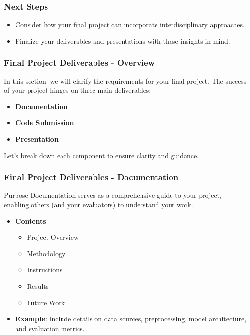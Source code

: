 \documentclass[aspectratio=169]{beamer}
\begin{document}
\begin{frame}[fragile]
    \frametitle{Next Steps}
    \begin{itemize}
        \item Consider how your final project can incorporate interdisciplinary approaches.
        \item Finalize your deliverables and presentations with these insights in mind.
    \end{itemize}
\end{frame}

\begin{frame}[fragile]
    \frametitle{Final Project Deliverables - Overview}
    In this section, we will clarify the requirements for your final project. The success of your project hinges on three main deliverables:
    \begin{itemize}
        \item \textbf{Documentation}
        \item \textbf{Code Submission}
        \item \textbf{Presentation}
    \end{itemize}
    Let’s break down each component to ensure clarity and guidance.
\end{frame}

\begin{frame}[fragile]
    \frametitle{Final Project Deliverables - Documentation}
    \begin{block}{Purpose}
        Documentation serves as a comprehensive guide to your project, enabling others (and your evaluators) to understand your work.
    \end{block}
    \begin{itemize}
        \item \textbf{Contents}:
        \begin{itemize}
            \item Project Overview
            \item Methodology
            \item Instructions
            \item Results
            \item Future Work
        \end{itemize}
        \item \textbf{Example}: Include details on data sources, preprocessing, model architecture, and evaluation metrics.
    \end{itemize}
\end{frame}
\end{document}
